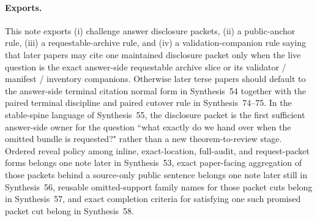 \documentclass[11pt]{article}
\begin{document}
\paragraph{Exports.}
This note exports (i) challenge answer disclosure packets, (ii) a public-anchor rule, (iii) a requestable-archive rule, and (iv) a validation-companion rule saying that later papers may cite one maintained disclosure packet only when the live question is the exact answer-side requestable archive slice or its validator / manifest / inventory companions. Otherwise later terse papers should default to the answer-side terminal citation normal form in Synthesis~54 together with the paired terminal discipline and paired cutover rule in Synthesis~74--75. In the stable-spine language of Synthesis~55, the disclosure packet is the first sufficient answer-side owner for the question ``what exactly do we hand over when the omitted bundle is requested?" rather than a new theorem-to-review stage. Ordered reveal policy among inline, exact-location, full-audit, and request-packet forms belongs one note later in Synthesis~53, exact paper-facing aggregation of those packets behind a source-only public sentence belongs one note later still in Synthesis~56, reusable omitted-support family names for those packet cuts belong in Synthesis~57, and exact completion criteria for satisfying one such promised packet cut belong in Synthesis~58.\cite{series:challengeanswerreviewmenus,series:pairedterminalcitationdiscipline,series:pairedterminalcutoverrules}
\end{document}
